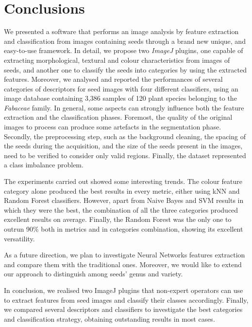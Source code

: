 \documentclass[a4paper,12pt]{article}
\begin{document}
\section{Conclusions}
We presented a software that performs an image analysis by feature extraction and classification from images containing seeds through a brand new unique, and easy-to-use framework. In detail, we propose two \emph{ImageJ} plugins, one capable of extracting morphological, textural and colour characteristics from images of seeds, and another one to classify the seeds into categories by using the extracted features. 
Moreover, we analysed and reported the performances of several categories of descriptors for seed images with four different classifiers, using an image database containing 3,386 samples of 120 plant species belonging to the \emph{Fabaceae} family. 
In general, some aspects can strongly influence both the feature extraction and the classification phases. Foremost, the quality of the original images to process can produce some artefacts in the segmentation phase. Secondly, the preprocessing step, such as the background cleaning, the spacing of the seeds during the acquisition, and the size of the seeds present in the images, need to be verified to consider only valid regions. Finally, the dataset represented a class imbalance problem.

The experiments carried out showed some interesting trends. The colour feature category alone produced the best results in every metric, either using kNN and Random Forest classifiers. However, apart from Naive Bayes and SVM results in which they were the best, the combination of all the three categories produced excellent results on average. Finally, the Random Forest was the only one to outrun 90\% both in metrics and in categories combination, showing its excellent versatility.

As a future direction, we plan to investigate Neural Networks features extraction and compare them with the traditional ones. Moreover, we would like to extend our approach to distinguish among seeds' genus and variety.

In conclusion, we realised two ImageJ plugins that non-expert operators can use to extract features from seed images and classify their classes accordingly. Finally, we compared several descriptors and classifiers to investigate the best categories and classification strategy, obtaining outstanding results in most cases.



\end{document}
